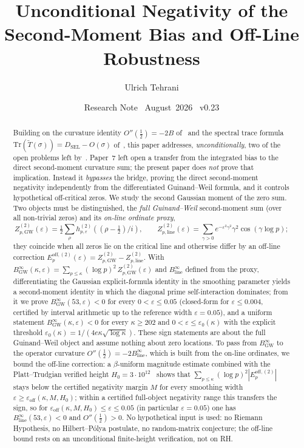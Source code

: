 \documentclass[11pt]{article}
\title{\vspace{-1.5em}\bfseries Unconditional Negativity of the
Second-Moment Bias and Off-Line Robustness}
\author{Ulrich Tehrani}
\date{Research Note \textperiodcentered\ August~2026
      \textperiodcentered\ v0.23}
\newcommand{\Tt}{\widetilde{T}}
\newcommand{\DSEL}{D_{\mathrm{SEL}}}
\newcommand{\BinfGW}{B_{\mathrm{GW}}^{\infty}}   %
\newcommand{\Binfline}{B_{\mathrm{line}}^{\infty}} %
\newcommand{\ZtwoGW}{Z_{p,\mathrm{GW}}^{(2)}}   %
\newcommand{\Ztwoline}{Z_{p,\mathrm{line}}^{(2)}} %
\newcommand{\Eoff}{E_p^{\mathrm{off},(2)}}  %
\begin{document}
\maketitle

\begin{abstract}
Building on the curvature identity $O''(\tfrac12)=-2B$ of~\cite{Paper6}
and the spectral trace formula $\mathrm{Tr}(\Tt(\sigma))=\DSEL-O(\sigma)$
of~\cite{Paper5}, this paper addresses, \emph{unconditionally}, two of the
open problems left by~\cite{Paper7}. Paper~7 left open a transfer from the
integrated bias to the direct second-moment curvature sum; the present paper
does \emph{not} prove that implication. Instead it \emph{bypasses} the
bridge, proving the direct second-moment negativity independently from the
differentiated Guinand--Weil formula, and it controls hypothetical
off-critical zeros.
We study the second Gaussian moment of the zero sum. Two objects must be
distinguished, the \emph{full Guinand--Weil} second-moment sum (over all
non-trivial zeros) and its \emph{on-line ordinate proxy},
\[
\ZtwoGW(\varepsilon)=\tfrac12\sum_\rho h^{(2)}_{p,\varepsilon}((\rho-\tfrac12)/i),
\qquad
\Ztwoline(\varepsilon)=\sum_{\gamma>0}e^{-\varepsilon^2\gamma^2}\gamma^2\cos(\gamma\log p);
\]
they coincide when all zeros lie on the critical line and otherwise differ by
an off-line correction $\Eoff(\varepsilon)=\ZtwoGW-\Ztwoline$.
With $\BinfGW(\kappa,\varepsilon)=\sum_{p\le\kappa}(\log p)^2\,\ZtwoGW(\varepsilon)$
and $\Binfline$ defined from the proxy, differentiating the Gaussian
explicit-formula identity in the smoothing parameter yields a second-moment
identity in which the diagonal prime self-interaction dominates; from it we
prove $\BinfGW(53,\varepsilon)<0$ for every $0<\varepsilon\le 0.05$
(closed-form for $\varepsilon\le 0.004$, certified by interval arithmetic up
to the reference width $\varepsilon=0.05$), and a uniform statement
$\BinfGW(\kappa,\varepsilon)<0$ for every $\kappa\ge 202$ and
$0<\varepsilon\le\varepsilon_0(\kappa)$ with the explicit threshold
$\varepsilon_0(\kappa)=1/(4e\kappa\sqrt{\log\kappa})$.
These sign statements are about the full Guinand--Weil object and assume
nothing about zero locations.
To pass from $\BinfGW$ to the operator curvature $O''(\tfrac12)=-2\Binfline$,
which is built from the on-line ordinates, we bound the off-line correction:
a $\beta$-uniform magnitude estimate combined with the Platt--Trudgian
verified height $H_0=3\cdot10^{12}$~\cite{PlattTrudgian21} shows that
$\sum_{p\le\kappa}(\log p)^2|\Eoff|$ stays below the certified negativity
margin $M$ for every smoothing width $\varepsilon\ge\varepsilon_{\mathrm{off}}(\kappa,M,H_0)$;
within a certified full-object negativity range this transfers the sign, so
for $\varepsilon_{\mathrm{off}}(\kappa,M,H_0)\le\varepsilon\le 0.05$ (in particular
$\varepsilon=0.05$) one has $\Binfline(53,\varepsilon)<0$ and
$O''(\tfrac12)>0$.
No hypothetical input is used: no Riemann Hypothesis, no Hilbert--P\'olya
postulate, no random-matrix conjecture; the off-line bound rests on an
unconditional finite-height verification, not on RH.


\end{abstract}
\end{document}
